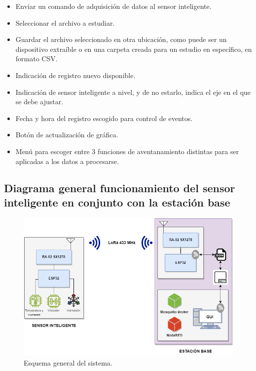 \begin{itemize}
    \item Enviar un comando de adquisición de datos al sensor inteligente.
    \item Seleccionar el archivo a estudiar.
    \item Guardar el archivo seleccionado en otra ubicación, como puede ser un dispositivo extraíble o en una carpeta creada para un estudio en específico, en formato CSV.
    \item Indicación de registro nuevo disponible.
    \item Indicación de sensor inteligente a nivel, y de no estarlo, indica el eje en el que se debe ajustar.
    \item Fecha y hora del registro escogido para control de eventos.
    \item Botón de actualización de gráfica.
    \item Menú para escoger entre 3 funciones de aventanamiento distintas para ser aplicadas a los datos a procesarse.
\end{itemize}


\subsection{Diagrama general funcionamiento del sensor inteligente en conjunto con la estación base}

\begin{figure}[H]
    \centering
    \includegraphics[width = \textwidth]{imagenes/cap2_marcometod/EsquemaGeneralSistema.png}
    \caption{Esquema general del sistema.}
    \label{fig:esquemageneral}
\end{figure}

